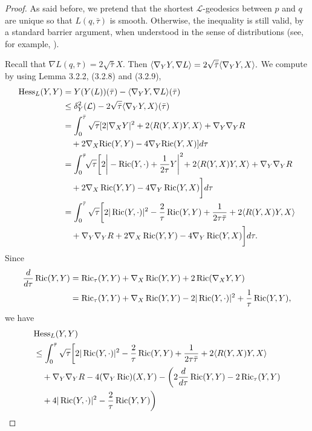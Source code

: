 \begin{proof}
As said before, we pretend that the shortest
$\mathcal{L}$-geodesics between $p$ and $q$ are unique so that
$L(q,\bar{\tau})$ is smooth. Otherwise, the inequality is still
valid, by a standard barrier argument, when understood in the
sense of distributions (see, for example, \cite{ScY}).

Recall that $\nabla L(q,\bar{\tau})=2\sqrt{\bar{\tau}}X$. Then
$\langle\nabla_YY,\nabla L\rangle=2\sqrt{\bar{\tau}}\langle\nabla_YY,X\rangle.$ We
compute by using Lemma 3.2.2, (3.2.8) and (3.2.9),
\begin{align*}
{\rm Hess}_L(Y,Y)&  = Y(Y(L))(\bar{\tau})-\langle\nabla_YY,\nabla
L\rangle(\bar\tau)\\
& \leq \delta_Y^2({\mathcal{L}})-2\sqrt{\bar{\tau}}
\langle\nabla_YY,X\rangle(\bar\tau)\\
&  = \int_0^{\bar{\tau}}\sqrt{\tau}[2 |\nabla_XY|^2
+2\langle R(Y,X)Y,X\rangle+\nabla_Y\nabla_YR\\
&\quad +2\nabla_X{\operatorname{Ric}}(Y,Y)-4\nabla_Y{\operatorname{Ric}}(Y,X)]d\tau\\
&  = \int_0^{\bar{\tau}}\!\!\sqrt{\tau}\bigg[2
\bigg|-\operatorname{Ric}(Y,\cdot)
+\frac{1}{2\tau}Y\bigg|^2\!+2\langle R(Y,X)Y,X\rangle+\nabla_Y\nabla_YR\\
&\quad +2\nabla_X \operatorname{Ric}(Y,Y)-4\nabla_Y \operatorname{Ric}(Y,X)\bigg]d\tau\\
& =\int_0^{\bar{\tau}}\sqrt{\tau}\bigg[2|\operatorname{Ric}(Y,\cdot)|^2
-\frac{2}{\tau}\operatorname{Ric}(Y,Y)
+\frac{1}{2\tau\bar{\tau}}+2\langle R(Y,X)Y,X\rangle\\
&\quad +\nabla_Y\nabla_YR+2\nabla_X \operatorname{Ric}(Y,Y)-4\nabla_Y
\operatorname{Ric}(Y,X)\bigg]d\tau.
\end{align*}
Since
\begin{align*}
\frac{d}{d\tau}\operatorname{Ric}(Y,Y)
&  =\operatorname{Ric}_\tau(Y,Y)+\nabla_X \operatorname{Ric}(Y,Y)+2\operatorname{Ric}(\nabla_XY,Y)\\
&  = \operatorname{Ric}_\tau(Y,Y)+\nabla_X
\operatorname{Ric}(Y,Y)-2|\operatorname{Ric}(Y,\cdot)|^2+\frac{1}{\tau}\operatorname{Ric}(Y,Y),
\end{align*}
we have
\begin{align*}
&{\rm Hess}_L(Y,Y) \\
& \leq\int_0^{\bar{\tau}}\sqrt{\tau}\bigg[2|\Ric(Y,\cdot)|^2
-\frac{2}{\tau}\Ric(Y,Y)+\frac{1}{2\tau\bar{\tau}}
+2\langle R(Y,X)Y,X\rangle\\
&\quad +\nabla_Y\nabla_YR-4(\nabla_Y \Ric)(X,Y)
-\bigg(2\frac{d}{d\tau}\Ric(Y,Y)-2\Ric_\tau(Y,Y)\\
&\quad +4|\Ric(Y,\cdot)|^2-\frac{2}{\tau}\Ric(Y,Y)\bigg)

\end{align*}
\end{proof}
